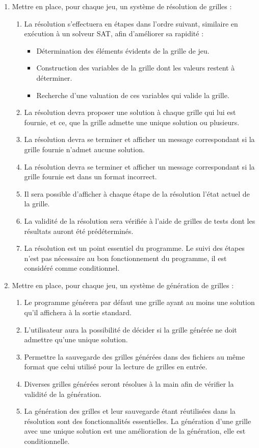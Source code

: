 \documentclass[12pt]{article}
\begin{document}
\begin{enumerate}
\item \label{besoinF3} Mettre en place, pour chaque jeu, un système de résolution de grilles :
\begin{enumerate}
\item La résolution s'effectuera en étapes dans l'ordre suivant, similaire en exécution à un solveur SAT, afin d'améliorer sa rapidité :
\begin{itemize}
\item Détermination des éléments évidents de la grille de jeu.
\item Construction des variables de la grille dont les valeurs restent à déterminer.
\item Recherche d'une valuation de ces variables qui valide la grille.
\end{itemize}
\item La résolution devra proposer une solution à chaque grille qui lui est fournie, et ce, que la grille admette une unique solution ou plusieurs.
\item La résolution devra se terminer et afficher un message correspondant si la grille fournie n'admet aucune solution.
\item La résolution devra se terminer et afficher un message correspondant si la grille fournie est dans un format incorrect.
\item \label{besoinF3e} Il sera possible d'afficher à chaque étape de la résolution l'état actuel de la grille.
\item La validité de la résolution sera vérifiée à l'aide de grilles de tests dont les résultats auront été prédéterminés.
\item La résolution est un point essentiel du programme. Le suivi des étapes n'est pas nécessaire au bon fonctionnement du programme, il est considéré comme conditionnel.
\end{enumerate}

\item \label {besoinF4} Mettre en place, pour chaque jeu, un système de génération de grilles :
\begin{enumerate}
\item Le programme générera par défaut une grille ayant au moins une solution qu'il affichera à la sortie standard.
\item \label {besoinF4b}L'utilisateur aura la possibilité de décider si la grille générée ne doit admettre qu'une unique solution. 
\item \label {besoinF4c}Permettre la sauvegarde des grilles générées dans des fichiers au même format que celui utilisé pour la lecture de grilles en entrée. 
\item Diverses grilles générées seront résolues à la main afin de vérifier la validité de la génération.
\item La génération des grilles et leur sauvegarde étant réutilisées dans la résolution sont des fonctionnalités essentielles. La génération d'une grille avec une unique solution est une amélioration de la génération, elle est conditionnelle.
\end{enumerate}


\end{enumerate}
\end{document}
